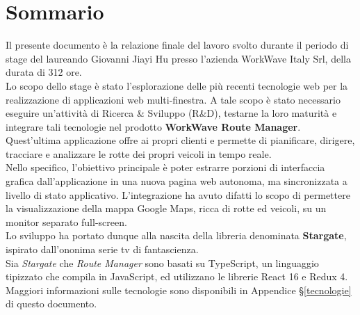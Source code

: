 
\cleardoublepage
{}
{}
\begingroup

\chapter*{Sommario}

Il presente documento è la relazione finale del lavoro svolto durante il periodo di stage del laureando Giovanni Jiayi Hu presso l'azienda WorkWave Italy Srl, della durata di 312 ore. \\

Lo scopo dello stage è stato l'esplorazione delle più recenti tecnologie web per la realizzazione di applicazioni web multi-finestra. A tale scopo è stato necessario eseguire un'attività di Ricerca \& Sviluppo (R\&D), testarne la loro maturità e integrare tali tecnologie nel prodotto \textbf{WorkWave Route Manager}. Quest'ultima applicazione offre ai propri clienti e permette di pianificare, dirigere, tracciare e analizzare le rotte dei propri veicoli in tempo reale. \\

Nello specifico, l'obiettivo principale è poter estrarre porzioni di interfaccia grafica dall'applicazione in una nuova pagina web autonoma, ma sincronizzata a livello di stato applicativo. L'integrazione ha avuto difatti lo scopo di permettere la visualizzazione della mappa Google Maps, ricca di rotte ed veicoli, su un monitor separato full-screen. \\

Lo sviluppo ha portato dunque alla nascita della libreria denominata \textbf{Stargate}, ispirato dall'ononima serie tv di fantascienza. \\

Sia \textit{Stargate} che \textit{Route Manager} sono basati su TypeScript, un linguaggio tipizzato che compila in JavaScript, ed utilizzano le librerie React 16 e Redux 4. Maggiori informazioni sulle tecnologie sono disponibili in Appendice §\ref{tecnologie} di questo documento.

%
%

\endgroup			

\vfill

